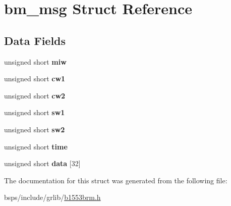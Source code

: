 \hypertarget{structbm__msg}{}\section{bm\+\_\+msg Struct Reference}
\label{structbm__msg}
\subsection*{Data Fields}
\begin{DoxyCompactItemize}
\item 
\mbox{\label{structbm__msg_a043647e25b9a9465704d383c1a108233}} 
unsigned short {\bfseries miw}
\item 
\mbox{\label{structbm__msg_ac2f731f1af800251baeda5d3ef4b6a01}} 
unsigned short {\bfseries cw1}
\item 
\mbox{\label{structbm__msg_a35759b58b50773168b24adc776971d30}} 
unsigned short {\bfseries cw2}
\item 
\mbox{\label{structbm__msg_a09170ae6a687d05734b24108708cdfb5}} 
unsigned short {\bfseries sw1}
\item 
\mbox{\label{structbm__msg_af343e3c59fa51bc5175ca93cdf63b348}} 
unsigned short {\bfseries sw2}
\item 
\mbox{\label{structbm__msg_a55ee11033cefd8823f570b0c82624467}} 
unsigned short {\bfseries time}
\item 
\mbox{\label{structbm__msg_a37e0ec88fc029e32b5634b43676a25be}} 
unsigned short {\bfseries data} \mbox{[}32\mbox{]}
\end{DoxyCompactItemize}


The documentation for this struct was generated from the following file\+:\begin{DoxyCompactItemize}
\item 
bsps/include/grlib/\mbox{\hyperlink{b1553brm_8h}{b1553brm.\+h}}\end{DoxyCompactItemize}

